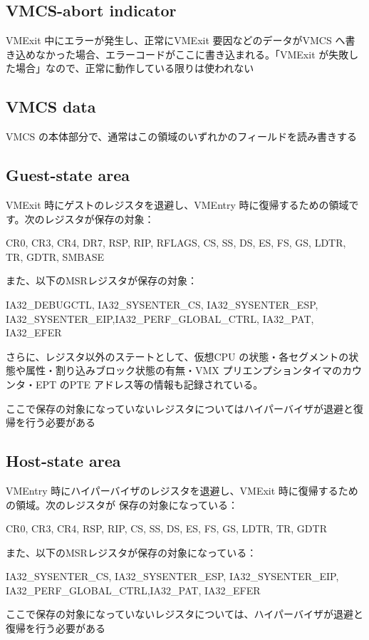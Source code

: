 \documentclass[a4j,12pt]{jarticle}
\begin{document}
\subsection*{VMCS-abort indicator}
VMExit 中にエラーが発生し、正常にVMExit 要因などのデータがVMCS へ書き込めなかった場合、エラーコードがここに書き込まれる。「VMExit が失敗した場合」なので、正常に動作している限りは使われない

\subsection*{VMCS data}
VMCS の本体部分で、通常はこの領域のいずれかのフィールドを読み書きする

\subsection*{Guest-state area}
VMExit 時にゲストのレジスタを退避し、VMEntry 時に復帰するための領域です。次のレジスタが保存の対象：

CR0, CR3, CR4, DR7, RSP, RIP, RFLAGS, CS, SS, DS, ES, FS, GS, LDTR, TR, GDTR, SMBASE

また、以下のMSRレジスタが保存の対象：

IA32\_DEBUGCTL, IA32\_SYSENTER\_CS, IA32\_SYSENTER\_ESP, IA32\_SYSENTER\_EIP,IA32\_PERF\_GLOBAL\_CTRL, IA32\_PAT, IA32\_EFER

さらに、レジスタ以外のステートとして、仮想CPU の状態・各セグメントの状態や属性・割り込みブロック状態の有無・VMX プリエンプションタイマのカウンタ・EPT のPTE アドレス等の情報も記録されている。

ここで保存の対象になっていないレジスタについてはハイパーバイザが退避と復帰を行う必要がある

\subsection*{Host-state area}
VMEntry 時にハイパーバイザのレジスタを退避し、VMExit 時に復帰するための領域。次のレジスタが
保存の対象になっている：

CR0, CR3, CR4, RSP, RIP, CS, SS, DS, ES, FS, GS, LDTR, TR, GDTR

また、以下のMSRレジスタが保存の対象になっている：

IA32\_SYSENTER\_CS, IA32\_SYSENTER\_ESP, IA32\_SYSENTER\_EIP, IA32\_PERF\_GLOBAL\_CTRL,IA32\_PAT, IA32\_EFER

ここで保存の対象になっていないレジスタについては、ハイパーバイザが退避と復帰を行う必要がある
\end{document}
